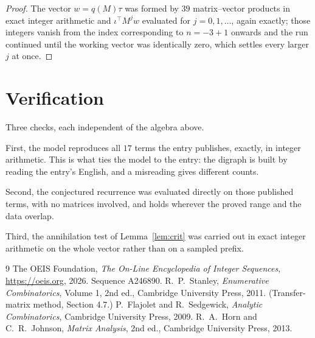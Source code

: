 \documentclass[11pt,a4paper]{article}
\theoremstyle{plain}
\theoremstyle{definition}
\begin{document}
\begin{proof}
The vector $w=q(M)\tau$ was formed by $39$ matrix--vector products in exact integer
arithmetic and $\iota^{\!\top}M^{j}w$ evaluated for $j=0,1,\dots$, again exactly; those
integers vanish from the index corresponding to $n=-3+1$ onwards and the run continued
until the working vector was identically zero, which settles every larger $j$ at once.
\end{proof}

\section{Verification}

Three checks, each independent of the algebra above.

First, the model reproduces all $17$ terms the entry publishes, exactly, in integer
arithmetic. This is what ties the model to the entry: the digraph is built by reading the
entry's English, and a misreading gives different counts.

Second, the conjectured recurrence was evaluated directly on those published terms, with no
matrices involved, and holds wherever the proved range and the data overlap.

Third, the annihilation test of Lemma~\ref{lem:crit} was carried out in exact integer
arithmetic on the whole vector rather than on a sampled prefix.

\begin{thebibliography}{9}
 The OEIS Foundation, \emph{The On-Line Encyclopedia of Integer
Sequences}, \url{https://oeis.org}, 2026. Sequence A246890.
 R.~P.~Stanley, \emph{Enumerative Combinatorics}, Volume 1, 2nd ed.,
Cambridge University Press, 2011. (Transfer-matrix method, Section 4.7.)
 P.~Flajolet and R.~Sedgewick, \emph{Analytic Combinatorics}, Cambridge
University Press, 2009.
 R.~A.~Horn and C.~R.~Johnson, \emph{Matrix Analysis}, 2nd ed., Cambridge
University Press, 2013.
\end{thebibliography}
\end{document}
